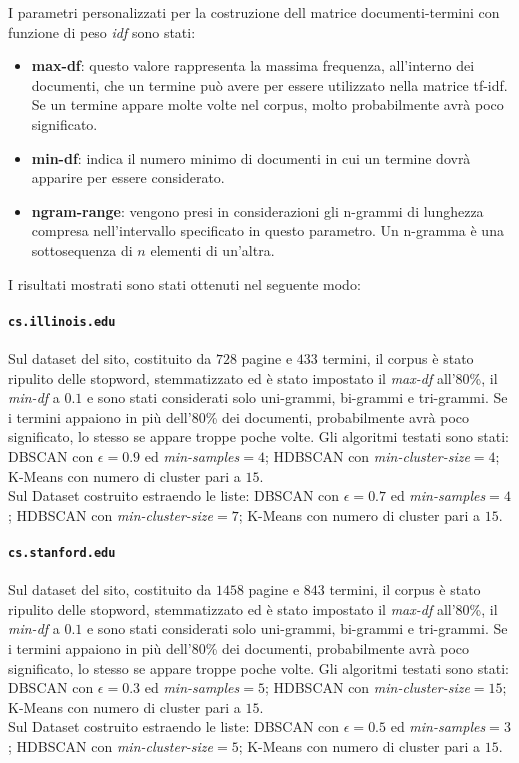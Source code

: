 I parametri personalizzati per la costruzione dell matrice documenti-termini con funzione di peso \textit{idf} sono stati:
\begin{itemize}
\item \textbf{max-df}: questo valore rappresenta la massima frequenza, all'interno dei documenti, che un termine può avere per essere utilizzato nella matrice tf-idf. Se un termine appare molte volte nel corpus, molto probabilmente avrà poco significato.
\item \textbf{min-df}: indica il numero minimo di documenti in cui un termine dovrà apparire per essere considerato.
\item \textbf{ngram-range}: vengono presi in considerazioni gli n-grammi di lunghezza compresa nell'intervallo specificato in questo parametro. Un n-gramma è una sottosequenza  di $n$ elementi di un'altra.
\end{itemize}

I risultati mostrati sono stati ottenuti nel seguente modo:
\paragraph{\texttt{cs.illinois.edu}}
Sul dataset del sito, costituito da $728$ pagine e $433$ termini, il corpus è stato ripulito delle stopword, stemmatizzato ed è stato impostato il \textit{max-df} all'80\%, il \textit{min-df} a $0.1$ e sono stati considerati solo uni-grammi, bi-grammi e tri-grammi. Se i termini appaiono in più dell'80\% dei documenti, probabilmente avrà poco significato, lo stesso se appare troppe poche volte. Gli algoritmi testati sono stati: DBSCAN con $\epsilon = 0.9$ ed \textit{min-samples}$ = 4$; HDBSCAN con \textit{min-cluster-size}$=4$; K-Means con numero di cluster pari a $15$. \\Sul Dataset costruito estraendo le liste: DBSCAN con $\epsilon = 0.7$ ed \textit{min-samples}$ = 4$; HDBSCAN con \textit{min-cluster-size}$=7$; K-Means con numero di cluster pari a $15$. 

\paragraph{\texttt{cs.stanford.edu}}
Sul dataset del sito, costituito da $1458$ pagine e $843$ termini, il corpus è stato ripulito delle stopword, stemmatizzato ed è stato impostato il \textit{max-df} all'80\%, il \textit{min-df} a $0.1$ e sono stati considerati solo uni-grammi, bi-grammi e tri-grammi. Se i termini appaiono in più dell'80\% dei documenti, probabilmente avrà poco significato, lo stesso se appare troppe poche volte. Gli algoritmi testati sono stati: DBSCAN con $\epsilon = 0.3$ ed \textit{min-samples}$ = 5$; HDBSCAN con \textit{min-cluster-size}$=15$; K-Means con numero di cluster pari a $15$. \\Sul Dataset costruito estraendo le liste: DBSCAN con $\epsilon = 0.5$ ed \textit{min-samples}$ = 3$; HDBSCAN con \textit{min-cluster-size}$=5$; K-Means con numero di cluster pari a $15$. 

